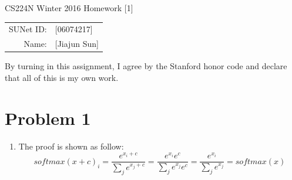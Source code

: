 \documentclass[10pt]{article}
\begin{document}
\begin{center}
{\Large CS224N Winter 2016 Homework [1]}

\begin{tabular}{rl}
SUNet ID: & [06074217] \\
Name: & [Jiajun Sun] \\
\end{tabular}
\end{center}

By turning in this assignment, I agree by the Stanford honor code and declare
that all of this is my own work.

\section*{Problem 1}
\begin{enumerate}[label=(\alph*)]
\item
The proof is shown as follow:
    \begin{equation*}
    	softmax(x+c)_i=\frac{e^{x_i+c}}{\sum_j e^{x_j+c}}=\frac{e^{x_i}e^c}{\sum_j e^{x_j}e^c}=\frac{e^{x_i}}{\sum_j e^{x_j}}=softmax(x)
    \end{equation*}

\end{enumerate}

\pagebreak[4]
\end{document}
